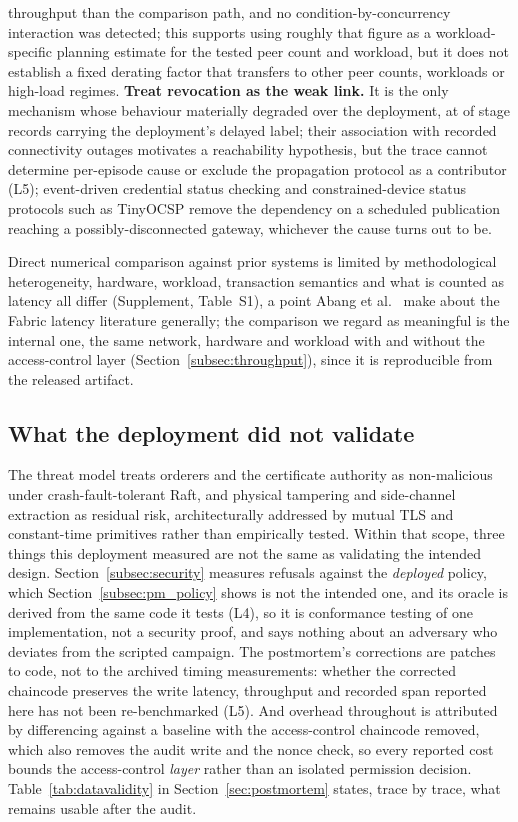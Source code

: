 \documentclass[a4paper,fleqn]{cas-sc}
\begin{document}
throughput than the comparison path, and no condition-by-concurrency
interaction was detected; this supports using roughly that figure as a
workload-specific planning estimate for the tested peer count and
workload, but it does not establish a fixed derating factor that transfers
to other peer counts, workloads or high-load regimes. \textbf{Treat
revocation as the weak link.} It is the only
mechanism whose behaviour materially degraded over the deployment, at
\RevDelayed{} of \RevEvents{} stage records carrying the deployment's
delayed label; their association with recorded connectivity outages
motivates a reachability hypothesis, but the trace cannot determine
per-episode cause or exclude the propagation protocol as a contributor
(L5); event-driven credential status checking
\cite{w3c_vc_status_list} and constrained-device status protocols such as
TinyOCSP \cite{fedrecheski2023tinyocsp} remove the dependency on a
scheduled publication reaching a possibly-disconnected gateway, whichever
the cause turns out to be.

Direct numerical comparison against prior systems is limited by
methodological heterogeneity, hardware, workload, transaction semantics
and what is counted as latency all differ (Supplement, Table~S1), a point
Abang et al.~\cite{abang2024latency} make about the Fabric latency
literature generally; the comparison we regard as meaningful is the
internal one, the same network, hardware and workload with and without
the access-control layer (Section~\ref{subsec:throughput}), since it is
reproducible from the released artifact.

\subsection{What the deployment did not validate}
\label{subsec:notvalidated}

The threat model treats orderers and the certificate authority as
non-malicious under crash-fault-tolerant Raft, and physical tampering and
side-channel extraction as residual risk, architecturally addressed by
mutual TLS and constant-time primitives rather than empirically tested.
Within that scope, three things this deployment measured are not the same
as validating the intended design. Section~\ref{subsec:security} measures
refusals against the \emph{deployed} policy, which
Section~\ref{subsec:pm_policy} shows is not the intended one, and its
oracle is derived from the same code it tests (L4), so it is conformance
testing of one implementation, not a security proof, and says nothing
about an adversary who deviates from the scripted campaign. The
postmortem's corrections are patches to code, not to the archived timing
measurements: whether the corrected chaincode preserves the write latency,
throughput and recorded span reported here has not been re-benchmarked
(L5). And overhead throughout is attributed by differencing against a
baseline with the access-control chaincode removed, which also removes the
audit write and the nonce check, so every reported cost bounds the
access-control \emph{layer} rather than an isolated permission decision.
Table~\ref{tab:datavalidity} in Section~\ref{sec:postmortem} states, trace
by trace, what remains usable after the audit.
\end{document}
